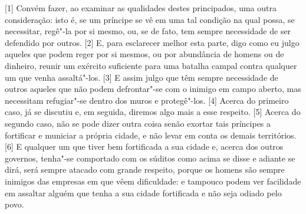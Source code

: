 {[}1{]} Convém fazer, ao examinar as qualidades destes
principados, uma outra
consideração: isto é, se um príncipe se vê em uma tal condição na qual
possa, se necessitar, regê"-la por si mesmo, ou, se de fato, tem
sempre necessidade de ser defendido por outros. {[}2{]} E, para
esclarecer melhor esta parte, digo como eu julgo aqueles que
podem reger por si
mesmos, ou por abundância de homens ou de dinheiro, reunir um exército
suficiente para uma batalha campal contra qualquer um que venha
assaltá"-los. {[}3{]} E assim julgo que têm sempre necessidade de outros
aqueles que não podem defrontar"-se com o inimigo em campo aberto, mas
necessitam refugiar"-se dentro dos muros e protegê"-los. {[}4{]} Acerca do
primeiro caso, já se discutiu e, em seguida,
diremos algo mais a esse respeito. {[}5{]} Acerca do segundo caso, não
se pode dizer outra coisa senão exortar tais príncipes a fortificar e
municiar a própria cidade, e não levar em conta os demais territórios.
{[}6{]} E qualquer um que tiver bem fortificada a sua cidade e, acerca
dos outros governos, tenha"-se comportado com os súditos como acima se
disse e adiante se dirá, será sempre atacado com grande respeito, porque
os homens são sempre inimigos das empresas em que vêem dificuldade: e
tampouco podem ver facilidade em assaltar alguém que tenha a sua cidade
fortificada e não seja odiado pelo povo.

